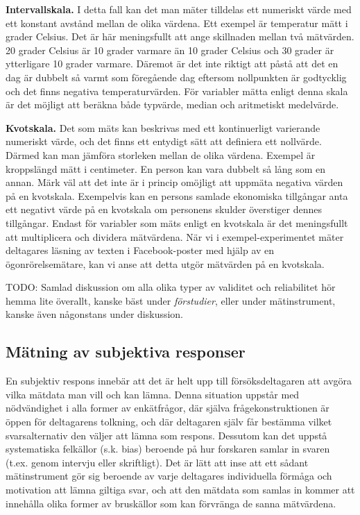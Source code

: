 \documentclass[
]{book}
\begin{document}
\textbf{Intervallskala.} I detta fall kan det man mäter tilldelas ett numeriskt värde med ett konstant avstånd mellan de olika värdena. Ett exempel är temperatur mätt i grader Celsius. Det är här meningsfullt att ange skillnaden mellan två mätvärden. 20 grader Celsius är 10 grader varmare än 10 grader Celsius och 30 grader är ytterligare 10 grader varmare. Däremot är det inte riktigt att påstå att det en dag är dubbelt så varmt som föregående dag eftersom nollpunkten är godtycklig och det finns negativa temperaturvärden. För variabler mätta enligt denna skala är det möjligt att beräkna både typvärde, median och aritmetiskt medelvärde.

\textbf{Kvotskala.} Det som mäts kan beskrivas med ett kontinuerligt varierande numeriskt värde, och det finns ett entydigt sätt att definiera ett nollvärde. Därmed kan man jämföra storleken mellan de olika värdena. Exempel är kroppslängd mätt i centimeter. En person kan vara dubbelt så lång som en annan. Märk väl att det inte är i princip omöjligt att uppmäta negativa värden på en kvotskala. Exempelvis kan en persons samlade ekonomiska tillgångar anta ett negativt värde på en kvotskala om personens skulder överstiger dennes tillgångar. Endast för variabler som mäts enligt en kvotskala är det meningsfullt att multiplicera och dividera mätvärdena. När vi i exempel-experimentet mäter deltagares läsning av texten i Facebook-poster med hjälp av en ögonrörelsemätare, kan vi anse att detta utgör mätvärden på en kvotskala.

TODO: Samlad diskussion om alla olika typer av validitet och reliabilitet hör hemma lite överallt, kanske bäst under \emph{förstudier}, eller under mätinstrument, kanske även någonstans under diskussion.

\hypertarget{sub07.3.2}{%
\subsection{Mätning av subjektiva responser}\label{sub07.3.2}}

En subjektiv respons innebär att det är helt upp till försöksdeltagaren att avgöra vilka mätdata man vill och kan lämna. Denna situation uppstår med nödvändighet i alla former av enkätfrågor, där själva frågekonstruktionen är öppen för deltagarens tolkning, och där deltagaren själv får bestämma vilket svarsalternativ den väljer att lämna som respons. Dessutom kan det uppstå systematiska felkällor (s.k. bias) beroende på hur forskaren samlar in svaren (t.ex. genom intervju eller skriftligt). Det är lätt att inse att ett sådant mätinstrument gör sig beroende av varje deltagares individuella förmåga och motivation att lämna giltiga svar, och att den mätdata som samlas in kommer att innehålla olika former av bruskällor som kan förvränga de sanna mätvärdena.
\end{document}
